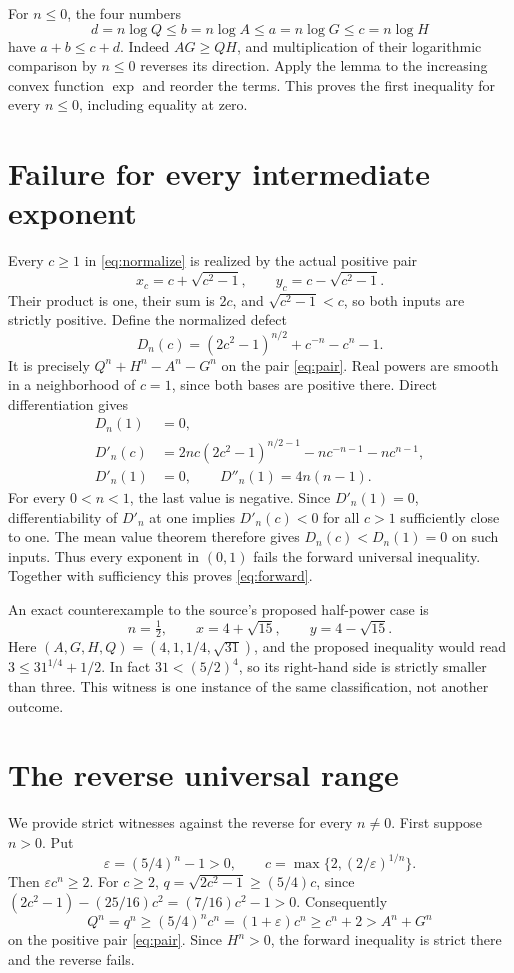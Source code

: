 \documentclass[11pt]{article}
\begin{document}
For $n\leq0$, the four numbers
\[
 d=n\log Q\leq b=n\log A\leq a=n\log G\leq c=n\log H
\]
have $a+b\leq c+d$. Indeed $AG\geq QH$, and multiplication of
their logarithmic comparison by $n\leq0$ reverses its direction.
Apply the lemma to the increasing convex function $\exp$ and reorder
the terms. This proves the first inequality for every $n\leq0$,
including equality at zero.

\section{Failure for every intermediate exponent}
Every $c\geq1$ in \eqref{eq:normalize} is realized by the actual
positive pair
\begin{equation}\label{eq:pair}
 x_c=c+\sqrt{c^2-1},\qquad y_c=c-\sqrt{c^2-1}.
\end{equation}
Their product is one, their sum is $2c$, and
$\sqrt{c^2-1}<c$, so both inputs are strictly positive.
Define the normalized defect
\begin{equation}\label{eq:defect}
 D_n(c)=(2c^2-1)^{n/2}+c^{-n}-c^n-1.
\end{equation}
It is precisely $Q^n+H^n-A^n-G^n$ on the pair \eqref{eq:pair}.
Real powers are smooth in a neighborhood of $c=1$, since both bases
are positive there. Direct differentiation gives
\begin{align*}
 D_n(1)&=0,\\
 D'_n(c)&=2nc(2c^2-1)^{n/2-1}
              -nc^{-n-1}-nc^{n-1},\\
 D'_n(1)&=0,\qquad D''_n(1)=4n(n-1).
\end{align*}
For every $0<n<1$, the last value is negative. Since
$D'_n(1)=0$, differentiability of $D'_n$ at one implies
$D'_n(c)<0$ for all $c>1$ sufficiently close to one.
The mean value theorem therefore gives $D_n(c)<D_n(1)=0$
on such inputs. Thus every exponent in $(0,1)$ fails the forward
universal inequality. Together with sufficiency this proves
\eqref{eq:forward}.

An exact counterexample to the source's proposed half-power case is
\[
 n=\tfrac12,\qquad x=4+\sqrt{15},\qquad y=4-\sqrt{15}.
\]
Here $(A,G,H,Q)=(4,1,1/4,\sqrt{31})$, and the proposed inequality
would read $3\leq31^{1/4}+1/2$. In fact $31<(5/2)^4$, so its
right-hand side is strictly smaller than three. This witness is one
instance of the same classification, not another outcome.

\section{The reverse universal range}
We provide strict witnesses against the reverse for every $n\ne0$.
First suppose $n>0$. Put
\[
 \varepsilon=(5/4)^n-1>0,\qquad
 c=\max\{2,(2/\varepsilon)^{1/n}\}.
\]
Then $\varepsilon c^n\geq2$. For $c\geq2$,
$q=\sqrt{2c^2-1}\geq(5/4)c$, since
$(2c^2-1)-(25/16)c^2=(7/16)c^2-1>0$.
Consequently
\[
 Q^n=q^n\geq(5/4)^nc^n
       =(1+\varepsilon)c^n\geq c^n+2>A^n+G^n
\]
on the positive pair \eqref{eq:pair}. Since $H^n>0$, the forward
inequality is strict there and the reverse fails.
\end{document}
